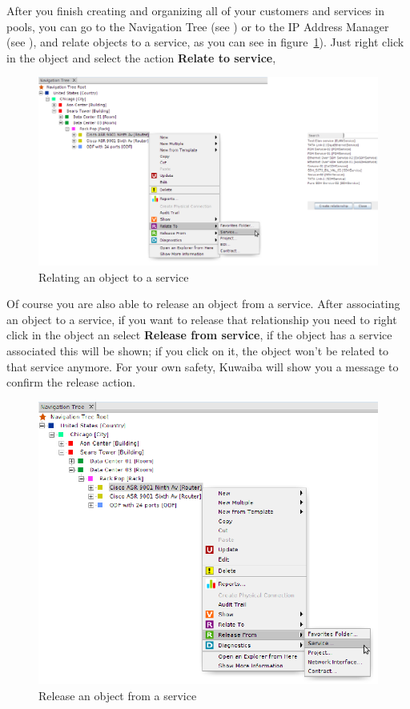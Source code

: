 \documentclass[a4paper]{article}
\begin{document}
	After you finish creating and organizing all of your customers and services in pools, you can go to the Navigation Tree (see \textbf{}) or to the IP Address Manager (see \textbf{}), and relate objects to a service, as you can see in figure~\ref{fig:sm_relate_to_service}). Just right click in the object and select the action \textbf{Relate to service},
	\begin{figure}[h!]
		\centering
		\includegraphics[width=0.9\linewidth]{img/sm_relate_to_service.png}
		\caption{Relating an object to a service}
		\label{fig:sm_relate_to_service}
	\end{figure}
	
	\newpage
	Of course you are also able to release an object from a service. After associating an object to a service, if you want to release that relationship you need to right click in the object an select  \textbf{Release from service}, if the object has a service associated this will be shown; if you click on it, the object won't be related to that service anymore. For your own safety, Kuwaiba will show you a message to confirm the release action.
	
	\begin{figure}[h!]
		\centering
		\includegraphics[width=0.9\linewidth]{img/sm_release_from_service.png}
		\caption{Release an object from a service}
		\label{fig:sm_release_from_service}
	\end{figure}
	
\end{document}
